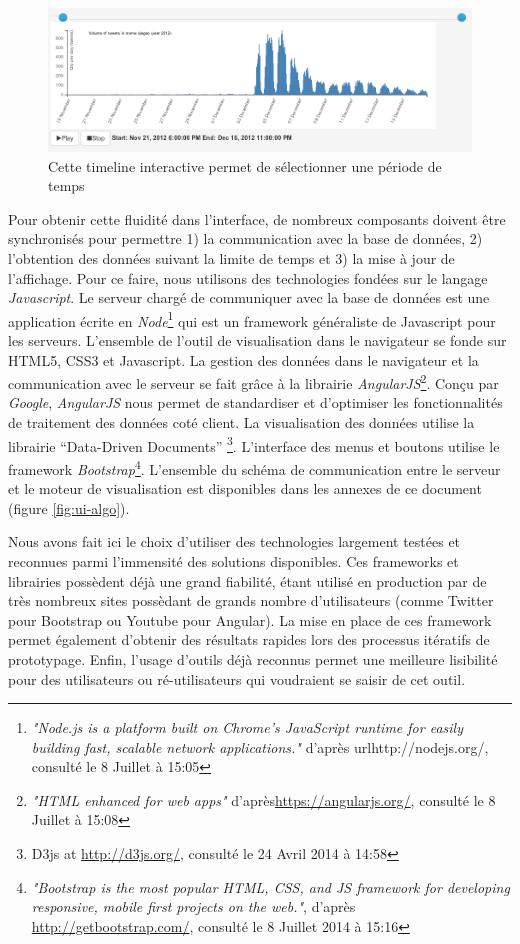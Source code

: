     \begin{figure}[h]
        \centering
        \includegraphics[scale=0.4]{figures/chap4/ui/ui-timeline.png}
        \caption{Cette timeline interactive permet de sélectionner une période de temps}
        \label{fig:ui-timeline}
    \end{figure}

    Pour obtenir cette fluidité dans l'interface, de nombreux composants doivent être synchronisés pour permettre 1) la communication avec la base de données, 2) l'obtention des données suivant la limite de temps et 3) la mise à jour de l'affichage. Pour ce faire, nous utilisons des technologies fondées sur le langage \textit{Javascript}. Le serveur chargé de communiquer avec la base de données est une application écrite en \textit{Node}\footnote{ \textit{"Node.js is a platform built on Chrome's JavaScript runtime for easily building fast, scalable network applications."} d'après url{http://nodejs.org/}, consulté le 8 Juillet à 15:05} qui est un framework généraliste de Javascript pour les serveurs. L{\textquoteright}ensemble de l{\textquoteright}outil de visualisation dans le navigateur se fonde sur HTML5, CSS3 et Javascript. La gestion des données dans le navigateur et la communication avec le serveur se fait grâce à la librairie \textit{AngularJS}\footnote{\textit{"HTML enhanced for web apps"} d'après\url{https://angularjs.org/}, consulté le 8 Juillet à 15:08}. Conçu par \textit{Google}, \textit{AngularJS} nous permet de standardiser et d'optimiser les fonctionnalités de traitement des données coté client. La visualisation des données utilise la librairie {\textquotedblleft}Data-Driven Documents{\textquotedblright} \citep{Bostock2011}\footnote{ D3js at \url{http://d3js.org/,} consulté le 24 Avril 2014 à 14:58}. L'interface des menus et boutons utilise le framework \textit{Bootstrap}\footnote{\textit{"Bootstrap is the most popular HTML, CSS, and JS framework for developing responsive, mobile first projects on the web."}, d'après \url{http://getbootstrap.com/}, consulté le 8 Juillet 2014 à 15:16}. L'ensemble du schéma de communication entre le serveur et le moteur de visualisation est disponibles dans les annexes de ce document (figure \ref{fig:ui-algo}).


    Nous avons fait ici le choix d'utiliser des technologies largement testées et reconnues parmi l'immensité des solutions disponibles. Ces frameworks et librairies possèdent déjà une grand fiabilité, étant utilisé en production par de très nombreux sites possèdant de grands nombre d'utilisateurs (comme Twitter pour Bootstrap ou Youtube pour Angular). La mise en place de ces framework permet également d'obtenir des résultats rapides lors des processus itératifs de prototypage. Enfin, l'usage d'outils déjà reconnus permet une meilleure lisibilité pour des utilisateurs ou ré-utilisateurs qui voudraient se saisir de cet outil.